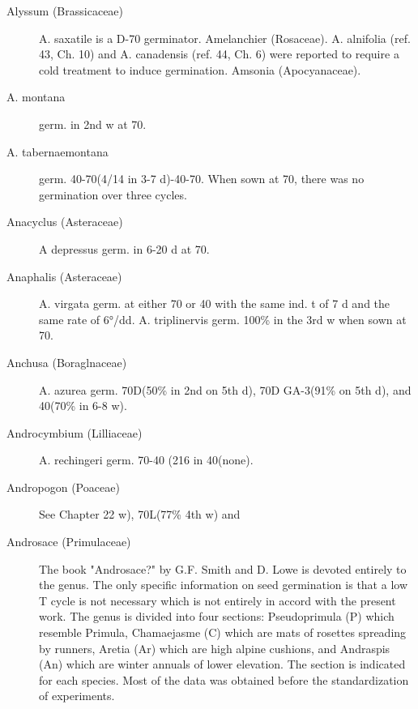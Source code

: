 \begin{description}
\item[Alyssum (Brassicaceae)] A. saxatile is a D-70 germinator.
Amelanchier (Rosaceae). A. alnifolia (ref. 43, Ch. 10) and A. canadensis
(ref. 44, Ch. 6) were reported to require a cold treatment to induce germination.
Amsonia (Apocyanaceae).
\item[A. montana] germ. in 2nd w at 70.
\item[A. tabernaemontana] germ. 40-70(4/14 in 3-7 d)-40-70. When sown at 70, there
was no germination over three cycles.
\item[Anacyclus (Asteraceae)] A depressus germ. in 6-20 d at 70.
\item[Anaphalis (Asteraceae)] A. virgata germ. at either 70 or 40 with the same
ind. t of 7 d and the same rate of 6°/dd. A. triplinervis germ. 100\% in the 3rd w when
sown at 70.
\item[Anchusa (Boraglnaceae)] A. azurea germ. 70D(50\% in 2nd
on 5th d), 70D GA-3(91\% on 5th d), and 40(70\% in 6-8 w).
\item[Androcymbium (Lilliaceae)] A. rechingeri germ. 70-40 (216 in
40(none).
\item[Andropogon (Poaceae)] See Chapter 22 w), 70L(77\% 4th w) and

\item[Androsace (Primulaceae)] The book "Androsace?" by G.F. Smith and D.
Lowe is devoted entirely to the genus. The only specific information on seed
germination is that a low T cycle is not necessary which is not entirely in accord with
the present work. The genus is divided into four sections: Pseudoprimula (P) which
resemble Primula, Chamaejasme (C) which are mats of rosettes spreading by runners,
Aretia (Ar) which are high alpine cushions, and Andraspis (An) which are winter
annuals of lower elevation. The section is indicated for each species. Most of the data
was obtained before the standardization of experiments.


\end{description}
